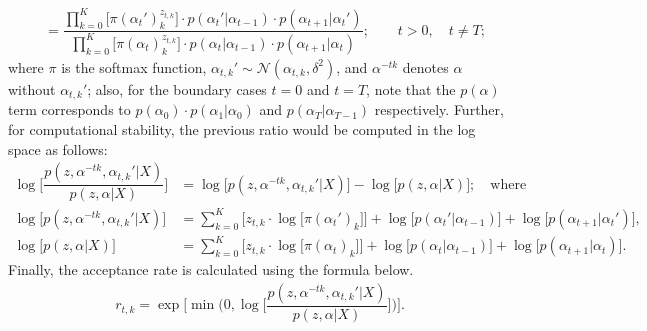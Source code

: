 \documentclass[12pt]{article}
\begin{document}
\begin{enumerate}
\begin{align*}
      &= \dfrac{\prod_{k=0}^K\big[\pi(\alpha_{t}')_k^{z_{t,k}}\big]\cdot p(\alpha_t'|\alpha_{t-1})\cdot p(\alpha_{t+1}|\alpha_t')}{\prod_{k=0}^K\big[\pi(\alpha_t)_k^{z_{t,k}}\big]\cdot p(\alpha_t|\alpha_{t-1})\cdot p(\alpha_{t+1}|\alpha_t)}; \qquad t > 0, \quad t \neq T;
    \end{align*}
    where $\pi$ is the softmax function, $\alpha_{t,k}' \sim \mathcal{N}(\alpha_{t, k}, \delta^2)$, and $\alpha^{-tk}$ denotes $\alpha$ without $\alpha_{t,k}'$; also, for the boundary cases $t=0$ and $t=T$, note that the $p(\alpha)$ term corresponds to $p(\alpha_{0})\cdot p(\alpha_{1}|\alpha_{0})$ and $p(\alpha_{T}|\alpha_{T-1})$ respectively. Further, for computational stability, the previous ratio would be computed in the log space as follows: 
    \begin{align*}
      \log{\bigg[\dfrac{p(z,\alpha^{-tk},\alpha_{t, k}'|X)}{p(z,\alpha|X)}\bigg]} &= \log{\big[p(z,\alpha^{-tk},\alpha_{t, k}'|X)\big]} - \log{\big[p(z,\alpha|X)\big]}; \quad \mbox{where}\\
      \log{\big[p(z,\alpha^{-tk},\alpha_{t, k}'|X)\big]} &=\sum_{k=0}^K\bigg[z_{t,k}\cdot\log\big[\pi(\alpha_{t}')_k\big]\bigg] + \log\big[p(\alpha_t'|\alpha_{t-1})\big] + \log\big[p(\alpha_{t+1}|\alpha_t')\big],\\
      \log\big[p(z,\alpha|X)\big] &= \sum_{k=0}^K\bigg[z_{t,k}\cdot\log\big[\pi(\alpha_{t})_k\big]\bigg] + \log\big[p(\alpha_t|\alpha_{t-1})\big] + \log\big[p(\alpha_{t+1}|\alpha_t)\big].
    \end{align*}
    Finally, the acceptance rate is calculated using the formula below.
    \begin{align*}
      r_{t,k} = \exp\bigg[\min{\bigg(0, \log{\bigg[\dfrac{p(z,\alpha^{-tk},\alpha_{t, k}'|X)}{p(z,\alpha|X)}\bigg]}\bigg)}\bigg].
    \end{align*}



\end{enumerate}
\end{document}
